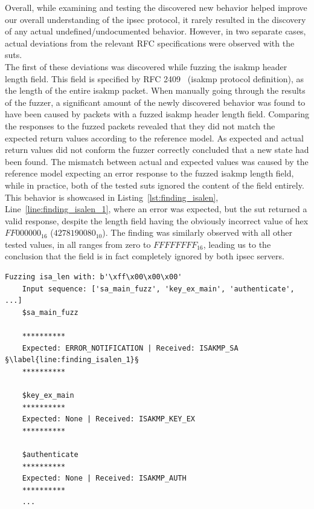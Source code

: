 Overall, while examining and testing the discovered new behavior helped improve our overall understanding of the \ac{ipsec} protocol, it rarely resulted in the discovery of any actual undefined/undocumented behavior. However, in two separate cases, actual deviations from the relevant RFC specifications were observed with the \acp{sut}. \\

The first of these deviations was discovered while fuzzing the \ac{isakmp} header length field. This field is specified by RFC 2409~\cite{rfc:isakmp} (\ac{isakmp} protocol definition), as the length of the entire \ac{isakmp} packet. When manually going through the results of the fuzzer, a significant amount of the newly discovered behavior was found to have been caused by packets with a fuzzed \ac{isakmp} header length field. Comparing the responses to the fuzzed packets revealed that they did not match the expected return values according to the reference model. As expected and actual return values did not conform the fuzzer correctly concluded that a new state had been found. The mismatch between actual and expected values was caused by the reference model expecting an error response to the fuzzed \ac{isakmp} length field, while in practice, both of the tested \acp{sut} ignored the content of the field entirely. This behavior is showcased in Listing~\ref{lst:finding_isalen}, Line~\ref{line:finding_isalen_1}, where an error was expected, but the \ac{sut} returned a valid response, despite the length field having the obviously incorrect value of hex $FF000000_{16}$ ($4278190080_{10}$). The finding was similarly observed with all other tested values, in all ranges from zero to $FFFFFFFF_{16}$, leading us to the conclusion that the field is in fact completely ignored by both \ac{ipsec} servers. \\
\vspace{3mm}
\begin{lstlisting}[float=h, caption=Discovered finding showing the ISAKMP length field being ignored., label=lst:finding_isalen, escapechar=§]
	Fuzzing isa_len with: b'\xff\x00\x00\x00'
	Input sequence: ['sa_main_fuzz', 'key_ex_main', 'authenticate', ...]
	$sa_main_fuzz

	**********
	Expected: ERROR_NOTIFICATION | Received: ISAKMP_SA §\label{line:finding_isalen_1}§
	**********
	
	$key_ex_main
	**********
	Expected: None | Received: ISAKMP_KEY_EX
	**********
	
	$authenticate
	**********
	Expected: None | Received: ISAKMP_AUTH
	**********
	...
\end{lstlisting}

